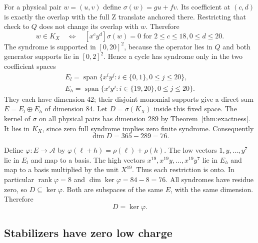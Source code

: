 \documentclass{article}
\DeclareMathOperator{\rank}{rank}
\DeclareMathOperator{\Span}{span}
\begin{document}
For a physical pair \(w = (u,v)\) define \(\sigma(w) = gu + fv\). Its coefficient at
\((c,d)\) is exactly the overlap with the full Z translate anchored there. Restricting that
check to \(Q\) does not change its overlap with \(w\). Therefore
\begin{equation}
  w \in K_X \quad \Longleftrightarrow \quad
  [x^c y^d]\sigma(w) = 0
  \text{ for } 2 \le c \le 18, 0 \le d \le 20.
\end{equation}
The syndrome is supported in \([0,20]^2\), because the operator lies in \(Q\) and both
generator supports lie in \([0,2]^2\). Hence a cycle has syndrome only in the two coefficient
spaces
\begin{gather}
  E_l = \Span\{x^i y^j : i \in \{0,1\}, 0 \le j \le 20\}, \\
  E_h = \Span\{x^i y^j : i \in \{19,20\}, 0 \le j \le 20\}.
\end{gather}
They each have dimension 42; their disjoint monomial supports give a direct sum
\(E = E_l \oplus E_h\) of dimension 84. Let \(D = \sigma(K_X)\) inside this fixed space. The
kernel of \(\sigma\) on all physical pairs has dimension 289 by Theorem~\ref{thm:exactness}.
It lies in \(K_X\), since zero full syndrome implies zero finite syndrome. Consequently
\begin{equation}
  \dim D = 365 - 289 = 76.
\end{equation}

Define \(\varphi \colon E \to \mathcal{A}\) by \(\varphi(\ell + h) = \rho(\ell) + \rho(h)\).
The low vectors \(1, y, \dots, y^7\) lie in \(E_l\) and map to a basis. The high vectors
\(x^{19}, x^{19} y, \dots, x^{19} y^7\) lie in \(E_h\) and map to a basis multiplied by the
unit \(X^{19}\). Thus each restriction is onto. In particular \(\rank \varphi = 8\) and
\(\dim \ker \varphi = 84 - 8 = 76\). All syndromes have residue zero, so
\(D \subseteq \ker \varphi\). Both are subspaces of the same \(E\), with the same dimension.
Therefore
\begin{equation}
  D = \ker \varphi.
\end{equation}

\subsection{Stabilizers have zero low charge}\label{sec:x-stabilizers}
\end{document}
